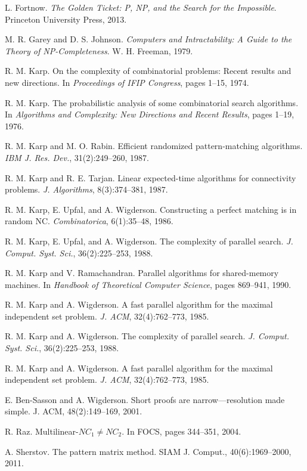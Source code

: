 \documentclass[11pt]{article}
\begin{document}
\begin{thebibliography}{99}
 L. Fortnow. \emph{The Golden Ticket: P, NP, and the Search for the Impossible}. Princeton University Press, 2013.

 M. R. Garey and D. S. Johnson. \emph{Computers and Intractability: A Guide to the Theory of NP-Completeness}. W. H. Freeman, 1979.

 R. M. Karp. On the complexity of combinatorial problems: Recent results and new directions. In \emph{Proceedings of IFIP Congress}, pages 1--15, 1974.

 R. M. Karp. The probabilistic analysis of some combinatorial search algorithms. In \emph{Algorithms and Complexity: New Directions and Recent Results}, pages 1--19, 1976.

 R. M. Karp and M. O. Rabin. Efficient randomized pattern-matching algorithms. \emph{IBM J. Res. Dev.}, 31(2):249--260, 1987.

 R. M. Karp and R. E. Tarjan. Linear expected-time algorithms for connectivity problems. \emph{J. Algorithms}, 8(3):374--381, 1987.

 R. M. Karp, E. Upfal, and A. Wigderson. Constructing a perfect matching is in random NC. \emph{Combinatorica}, 6(1):35--48, 1986.

 R. M. Karp, E. Upfal, and A. Wigderson. The complexity of parallel search. \emph{J. Comput. Syst. Sci.}, 36(2):225--253, 1988.

 R. M. Karp and V. Ramachandran. Parallel algorithms for shared-memory machines. In \emph{Handbook of Theoretical Computer Science}, pages 869--941, 1990.

 R. M. Karp and A. Wigderson. A fast parallel algorithm for the maximal independent set problem. \emph{J. ACM}, 32(4):762--773, 1985.

 R. M. Karp and A. Wigderson. The complexity of parallel search. \emph{J. Comput. Syst. Sci.}, 36(2):225--253, 1988.

 R. M. Karp and A. Wigderson. A fast parallel algorithm for the maximal independent set problem. \emph{J. ACM}, 32(4):762--773, 1985.

 E. Ben-Sasson and A. Wigderson. Short proofs are narrow—resolution made simple. 
      J. ACM, 48(2):149–169, 2001.

 R. Raz. Multilinear-$NC_1 \neq NC_2$. In FOCS, pages 344–351, 2004.

 A. Sherstov. The pattern matrix method. SIAM J. Comput., 40(6):1969–2000, 2011.

\end{thebibliography}
\end{document}
